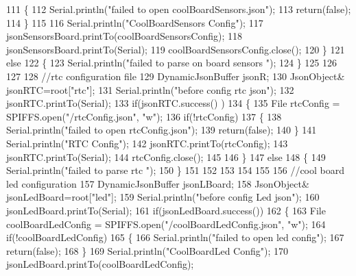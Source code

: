 \begin{DoxyCode}
111         \{
112             Serial.println(\textcolor{stringliteral}{"failed to open coolBoardSensors.json"});
113             \textcolor{keywordflow}{return}(\textcolor{keyword}{false});
114         \}
115         
116         Serial.println(\textcolor{stringliteral}{"CoolBoardSensors Config"});
117         jsonSensorsBoard.printTo(coolBoardSensorsConfig);
118         jsonSensorsBoard.printTo(Serial);
119         coolBoardSensorsConfig.close();
120     \}
121     \textcolor{keywordflow}{else}
122     \{
123         Serial.println(\textcolor{stringliteral}{"failed to parse on board sensors "});    
124     \}
125     
126     
127     
128     \textcolor{comment}{//rtc configuration file}
129     DynamicJsonBuffer jsonR;
130         JsonObject& jsonRTC=root[\textcolor{stringliteral}{"rtc"}];
131     Serial.println(\textcolor{stringliteral}{"before config rtc json"});
132     jsonRTC.printTo(Serial);
133     \textcolor{keywordflow}{if}(jsonRTC.success() )
134     \{
135         File rtcConfig = SPIFFS.open(\textcolor{stringliteral}{"/rtcConfig.json"}, \textcolor{stringliteral}{"w"});   
136         \textcolor{keywordflow}{if}(!rtcConfig)
137         \{
138             Serial.println(\textcolor{stringliteral}{"failed to open rtcConfig.json"});
139             \textcolor{keywordflow}{return}(\textcolor{keyword}{false});
140         \}
141         Serial.println(\textcolor{stringliteral}{"RTC Config"});
142         jsonRTC.printTo(rtcConfig);
143         jsonRTC.printTo(Serial);
144         rtcConfig.close();
145     
146     \}
147     \textcolor{keywordflow}{else}
148     \{
149         Serial.println(\textcolor{stringliteral}{"failed to parse rtc "});
150     \}
151 
152     
153     
154     
155     
156         \textcolor{comment}{//cool board led configuration}
157     DynamicJsonBuffer jsonLBoard;
158         JsonObject& jsonLedBoard=root[\textcolor{stringliteral}{"led"}];
159     Serial.println(\textcolor{stringliteral}{"before config Led json"});
160     jsonLedBoard.printTo(Serial);
161     \textcolor{keywordflow}{if}(jsonLedBoard.success())
162     \{   
163         File coolBoardLedConfig = SPIFFS.open(\textcolor{stringliteral}{"/coolBoardLedConfig.json"}, \textcolor{stringliteral}{"w"}); 
164         \textcolor{keywordflow}{if}(!coolBoardLedConfig)
165         \{
166             Serial.println(\textcolor{stringliteral}{"failed to open led config"});
167             \textcolor{keywordflow}{return}(\textcolor{keyword}{false});
168         \}
169         Serial.println(\textcolor{stringliteral}{"CoolBoardLed Config"});
170         jsonLedBoard.printTo(coolBoardLedConfig);

\end{DoxyCode}
